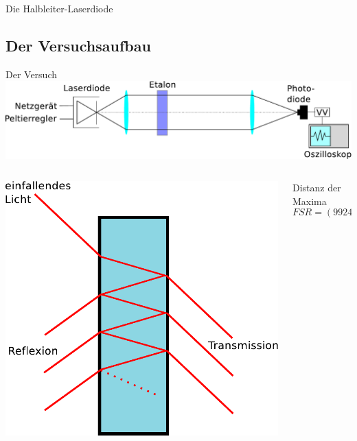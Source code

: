\documentclass{beamer}
\begin{document}
\begin{frame}{Die Halbleiter-Laserdiode} 
\end{frame}

\subsection{Der Versuchsaufbau}
\begin{frame}{Der Versuch}
\centering \includegraphics[width=\textwidth]{Bilder/ABLaser.pdf}
\begin{columns}
\begin{column}{4cm}
\pause \centering \includegraphics[width=\textwidth]{Bilder/etalon.pdf}
\end{column}
\begin{column}{5cm}
Distanz der Maxima
$$ FSR = (9924 \pm 30) MHz $$
\end{column}
\end{columns}
\end{frame}
\end{document}
